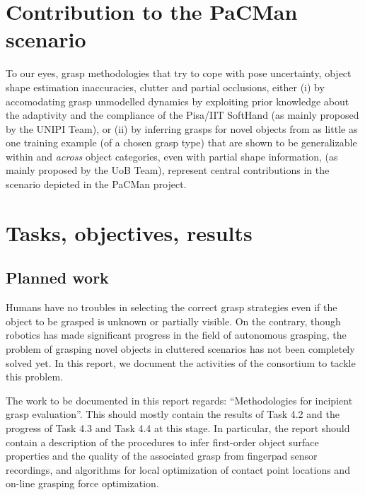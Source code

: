 \documentclass[a4paper,11pt,pdf]{pacmanreport}
\begin{document}
\section*{Contribution to the PaCMan scenario}

To our eyes, grasp methodologies that try to cope with pose uncertainty, object shape estimation inaccuracies, clutter and partial occlusions, either (i) by accomodating grasp unmodelled dynamics by exploiting prior knowledge about the adaptivity and the compliance of the Pisa/IIT SoftHand (as mainly proposed by the UNIPI Team), or (ii) by inferring grasps for novel objects from as little as one training example (of a chosen grasp type) that are shown to be generalizable within and \emph{across} object categories, even with partial shape information, (as mainly proposed by the UoB Team), represent central contributions in the scenario depicted in the PaCMan project.


\newpage

\section{Tasks, objectives, results}

\subsection{Planned work}

Humans have no troubles in selecting the correct grasp strategies even if the object to be grasped is unknown or partially visible. On the contrary, though robotics has made significant progress in the field of autonomous grasping, the problem of grasping novel objects in cluttered scenarios has not been completely solved yet. In this report, we document the activities of the consortium to tackle this problem.

The work to be documented in this report regards: ``Methodologies for incipient grasp evaluation''. This should mostly contain the results of Task 4.2 and the progress of Task 4.3 and Task 4.4 at this stage. In particular, the report should contain a description of the procedures to infer first-order object surface properties and the quality of the associated grasp from fingerpad sensor recordings, and algorithms for local optimization of contact point locations and on-line grasping force optimization.

\end{document}
